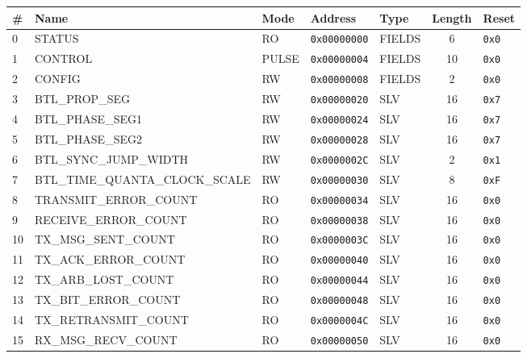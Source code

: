 \documentclass{article}
\begin{document}
\begin{table}[h!]
  \begin{center}
    \label{tab:table1}
    \begin{tabularx}{\linewidth}{|l|X|l|l|l|c|l|}
      \hline
      \textbf{\#} & \textbf{Name} & \textbf{Mode} & \textbf{Address} & \textbf{Type} & \textbf{Length} &
      \textbf{Reset} \\
      \hline
      0 & STATUS & RO & \texttt{0x00000000} & FIELDS & 6 & \texttt{0x0} \\
      \hline
      1 & CONTROL & PULSE & \texttt{0x00000004} & FIELDS & 10 & \texttt{0x0} \\
      \hline
      2 & CONFIG & RW & \texttt{0x00000008} & FIELDS & 2 & \texttt{0x0} \\
      \hline
      3 & BTL{\_}PROP{\_}SEG & RW & \texttt{0x00000020} & SLV & 16 & \texttt{0x7} \\
      \hline
      4 & BTL{\_}PHASE{\_}SEG1 & RW & \texttt{0x00000024} & SLV & 16 & \texttt{0x7} \\
      \hline
      5 & BTL{\_}PHASE{\_}SEG2 & RW & \texttt{0x00000028} & SLV & 16 & \texttt{0x7} \\
      \hline
      6 & BTL{\_}SYNC{\_}JUMP{\_}WIDTH & RW & \texttt{0x0000002C} & SLV & 2 & \texttt{0x1} \\
      \hline
      7 & BTL{\_}TIME{\_}QUANTA{\_}CLOCK{\_}SCALE & RW & \texttt{0x00000030} & SLV & 8 & \texttt{0xF} \\
      \hline
      8 & TRANSMIT{\_}ERROR{\_}COUNT & RO & \texttt{0x00000034} & SLV & 16 & \texttt{0x0} \\
      \hline
      9 & RECEIVE{\_}ERROR{\_}COUNT & RO & \texttt{0x00000038} & SLV & 16 & \texttt{0x0} \\
      \hline
      10 & TX{\_}MSG{\_}SENT{\_}COUNT & RO & \texttt{0x0000003C} & SLV & 16 & \texttt{0x0} \\
      \hline
      11 & TX{\_}ACK{\_}ERROR{\_}COUNT & RO & \texttt{0x00000040} & SLV & 16 & \texttt{0x0} \\
      \hline
      12 & TX{\_}ARB{\_}LOST{\_}COUNT & RO & \texttt{0x00000044} & SLV & 16 & \texttt{0x0} \\
      \hline
      13 & TX{\_}BIT{\_}ERROR{\_}COUNT & RO & \texttt{0x00000048} & SLV & 16 & \texttt{0x0} \\
      \hline
      14 & TX{\_}RETRANSMIT{\_}COUNT & RO & \texttt{0x0000004C} & SLV & 16 & \texttt{0x0} \\
      \hline
      15 & RX{\_}MSG{\_}RECV{\_}COUNT & RO & \texttt{0x00000050} & SLV & 16 & \texttt{0x0} \\

\end{tabularx}
\end{center}
\end{table}
\end{document}

